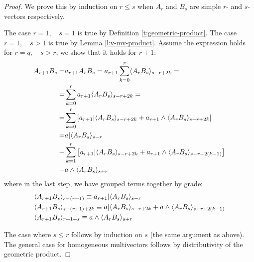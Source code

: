 \begin{proof}
	We prove this by induction on $r \leq s$ when $A_r$ and $B_s$ are simple $r$- and $s$-vectors respectively.

	The case $r=1,\quad s=1$ is true by Definition \ref{t:geometric-product}.
	The case $r=1,\quad s>1$ is true by Lemma \ref{l:v-mv-product}.
	Assume the expression holds for $r = q,\quad s > r$, we show that it holds for $r+1$:
	\begin{align*}
		A_{r+1}B_s = &a_{r+1}A_rB_s = a_{r+1}\sum_{k=0}^r \langle A_rB_s \rangle_{s-r+2k} = \\
		= &\sum_{k=0}^r a_{r+1}\langle A_rB_s \rangle_{s-r+2k} = \\
		= &\sum_{k=0}^r \left[a_{r+1} | \langle A_rB_s \rangle_{s-r+2k} + a_{r+1} \wedge \langle A_rB_s \rangle_{s-r+2k}\right]\\
		= &a | \langle A_rB_s \rangle_{s-r} \\
		  + &\sum_{k=1}^r \left[a_{r+1} | \langle A_rB_s \rangle_{s-r+2k} + a_{r+1} \wedge \langle A_rB_s \rangle_{s-r+2(k-1)}\right]\\
		  + &a\wedge \langle A_rB_s \rangle_{s+r}
	\end{align*}
	where in the last step, we have grouped terms together by grade:
	\begin{align*}
		&\langle A_{r+1}B_s \rangle_{s-(r+1)} \equiv a_{r+1} | \langle A_rB_s \rangle_{s-r} \\
		&\langle A_{r+1}B_s \rangle_{s-(r+1)+2k} \equiv a | \langle A_rB_s \rangle_{s-r+2k} + a \wedge \langle A_rB_s \rangle_{s-r+2(k-1)} \\
		&\langle A_{r+1}B_s \rangle_{r+1+s} \equiv a \wedge \langle A_rB_s \rangle_{s+r}
	\end{align*}

	The case where $s \leq r$ follows by induction on $s$ (the same argument as above).
	The general case for homogeneous multivectors follows by distributivity of the geometric product.
\end{proof}
